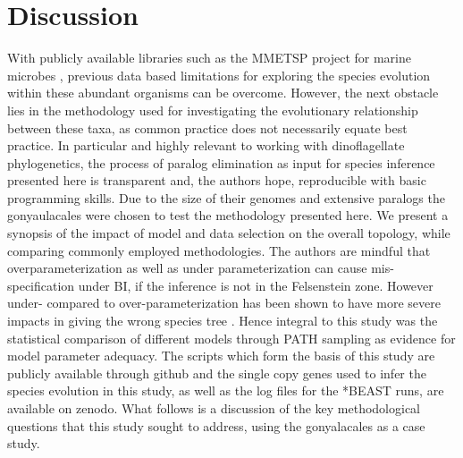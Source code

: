 \documentclass[12pt]{article}
\begin{document}
\section{Discussion}
With publicly available libraries such as the MMETSP project for marine microbes \cite{keeling2014marine}, previous data based limitations for exploring the species evolution within these abundant organisms can be overcome. 
However, the next obstacle lies in the methodology used for investigating the evolutionary relationship between these taxa, as common practice does not necessarily equate best practice.
In particular and highly relevant to working with dinoflagellate phylogenetics, the process of paralog elimination as input for species inference presented here is transparent and, the authors hope, reproducible with basic programming skills. 
Due to the size of their genomes and extensive paralogs the gonyaulacales were chosen to test the methodology presented here.
We present a synopsis of the impact of model and data selection on the overall topology, while comparing commonly employed methodologies. 
The authors are mindful that overparameterization as well as under parameterization can cause mis-specification under BI, if the inference is not in the Felsenstein zone. 
However under- compared to over-parameterization has been shown to have  more severe impacts in giving the wrong species tree \cite{lemmon2004importance}. 
Hence integral to this study was the statistical comparison of different models through PATH sampling as evidence for model parameter adequacy. 
The scripts which form the basis of this study are publicly available through github and the single copy genes used to infer the species evolution in this study, as well as the log files for the *BEAST runs, are available on zenodo. 
What follows is a discussion of the key methodological questions that this study sought to address, using the gonyalacales as a case study. 
\end{document}
